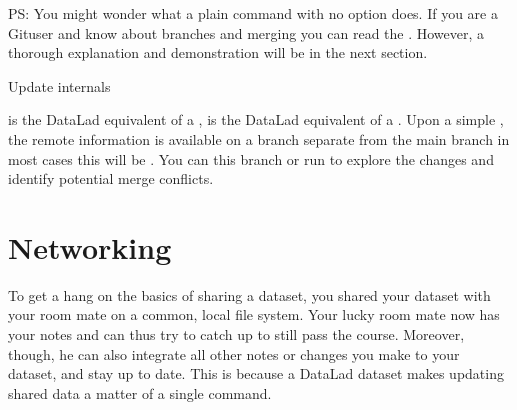 \sphinxAtStartPar
PS: You might wonder what a plain  command with no option does.
If you are a Git\sphinxhyphen{}user and know about branches and merging you can read the
. However, a thorough explanation
and demonstration will be in the next section.

\ignorespaces \begin{gitusernote}[label={index-1}, before title={\thetcbcounter\ }, check odd page=true]{Update internals}
\label{\detokenize{basics/101-119-sharelocal4:index-1}}

\sphinxAtStartPar
{} is the DataLad equivalent of a ,
 is the DataLad equivalent of a
.
Upon a simple , the remote information
is available on a branch separate from the main branch
\textendash{} in most cases this will be .
You can  this branch or run  to
explore the changes and identify potential merge conflicts.


\end{gitusernote}

\sphinxstepscope


\section{Networking}
\label{\detokenize{basics/101-121-siblings:networking}}\label{\detokenize{basics/101-121-siblings:sibling}}\label{\detokenize{basics/101-121-siblings::doc}}
\sphinxAtStartPar
To get a hang on the basics of sharing a dataset,
you shared your  dataset with your
room mate on a common, local file system. Your lucky
room mate now has your notes and can thus try to catch
up to still pass the course.
Moreover, though, he can also integrate all other notes
or changes you make to your dataset, and stay up to date.
This is because a DataLad dataset makes updating shared
data a matter of a single  command.

